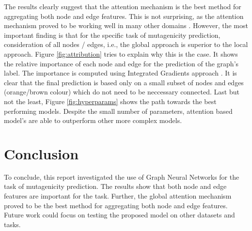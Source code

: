 \documentclass[10pt,twocolumn]{article}
\begin{document}
The results clearly suggest that the attention mechanism is the best method for aggregating
both node and edge features. This is not surprising, as the attention mechanism proved to be working
well in many other domains \cite{transfomers}. However, the most important finding is that for the specific task of
mutagenicity prediction, consideration of all nodes / edges, i.e., the global approach is superior
to the local approach. Figure \ref{fig:attribution} tries to explain why this is the case. It shows the
relative importance of each node and edge for the prediction of the graph's label. The importance is
computed using Integrated Gradients approach \cite{attribution}. It is clear that the final prediction is
based only on a small subset of nodes and edges (orange/brown colour) which do not need to be neccessary 
connected. Last but not the least, Figure \ref{fig:hyperparams} shows the path towards the best performing models. Despite 
the small number of parameters, attention based model's are able to outperform other more complex models. 

\section{Conclusion}
To conclude, this report investigated the use of Graph Neural Networks for the task of mutagenicity prediction. 
The results show that both node and edge features are important for the task. Further, the global attention mechanism
proved to be the best method for aggregating both node and edge features. Future work could focus on
testing the proposed model on other datasets and tasks.

\newpage


\end{document}

